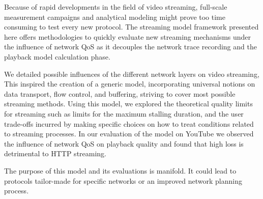 Because of rapid developments in the field of video streaming, full-scale measurement campaigns and analytical modeling might prove too time consuming to test every new protocol. The streaming model framework presented here offers methodologies to quickly evaluate new streaming mechanisms under the influence of network QoS as it decouples the network trace recording and the playback model calculation phase.

We detailed possible influences of the different network layers on video streaming, This inspired the creation of a generic model, incorporating universal notions on data transport, flow control, and buffering, striving to cover most possible streaming methods. Using this model, we explored the theoretical quality limits for streaming such as limits for the maximum stalling duration, and the user trade-offs incurred by making specific choices on how to treat conditions related to streaming processes. In our evaluation of the model on YouTube we observed the influence of network QoS on playback quality and found that high loss is detrimental to HTTP streaming.

The purpose of this model and its evaluations is manifold. It could lead to protocols tailor-made for specific networks or an improved network planning process.
